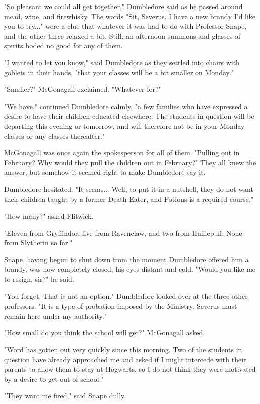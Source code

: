 "So pleasant we could all get together," Dumbledore said as he passed around mead, wine, and firewhisky. The words "Sit, Severus, I have a new brandy I'd like you to try..." were a clue that whatever it was had to do with Professor Snape, and the other three relaxed a bit. Still, an afternoon summons and glasses of spirits boded no good for any of them.

"I wanted to let you know," said Dumbledore as they settled into chairs with goblets in their hands, "that your classes will be a bit smaller on Monday."

"Smaller?" McGonagall exclaimed. "Whatever for?"

"We have," continued Dumbledore calmly, "a few families who have expressed a desire to have their children educated elsewhere. The students in question will be departing this evening or tomorrow, and will therefore not be in your Monday classes or any classes thereafter."

McGonagall was once again the spokesperson for all of them. "Pulling out in February? Why would they pull the children out in February?" They all knew the answer, but somehow it seemed right to make Dumbledore say it.

Dumbledore hesitated. "It seems... Well, to put it in a nutshell, they do not want their children taught by a former Death Eater, and Potions is a required course."

"How many?" asked Flitwick.

"Eleven from Gryffindor, five from Ravenclaw, and two from Hufflepuff. None from Slytherin so far."

Snape, having begun to shut down from the moment Dumbledore offered him a brandy, was now completely closed, his eyes distant and cold. "Would you like me to resign, sir?" he said.

"You forget. That is not an option." Dumbledore looked over at the three other professors. "It is a type of probation imposed by the Ministry. Severus must remain here under my authority."

"How small do you think the school will get?" McGonagall asked.

"Word has gotten out very quickly since this morning. Two of the students in question have already approached me and asked if I might intercede with their parents to allow them to stay at Hogwarts, so I do not think they were motivated by a desire to get out of school."

"They want me fired," said Snape dully.

